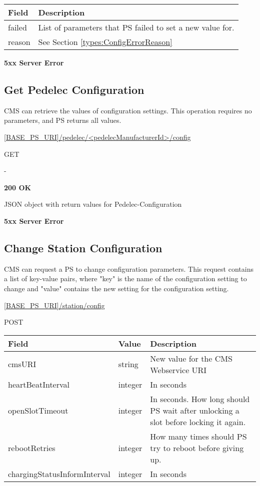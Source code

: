 \begin{tabularx}{\linewidth}{ | l | X | }
  \hline
  \rowcolor{table-head}
  Field & Description \\
  \hline
  failed		& List of parameters that \acs{PS} failed to set a new value for.\\
  reason 	& See Section \ref{types:ConfigErrorReason} \\
  \hline
\end{tabularx}

\textbf{5xx Server Error}

\subsection{Get Pedelec Configuration}

\acs{CMS} can retrieve the values of configuration settings. This operation requires no parameters, and \acs{PS} returns all values.

 \url{[BASE_PS_URI]/pedelec/<pedelecManufacturerId>/config}

 GET

 -

 \textbf{200 OK}

JSON object with return values for Pedelec-Configuration

 \textbf{5xx Server Error}

\subsection{Change Station Configuration}
\label{cms:change-conf}

\acs{CMS} can request a \acs{PS} to change configuration parameters. This request contains a list of key-value pairs, where "key" is the name of the configuration setting to change and "value" contains the new setting for the configuration setting.

 \url{[BASE_PS_URI]/station/config}

 POST

\begin{table}[!h]
\vspace{-7mm}
\begin{tabularx}{\linewidth}{ | l | l | X | }
  \hline
  \rowcolor{table-head}
  Field & Value & Description \\
  \hline
  cmsURI 			& string 		& New value for the \acs{CMS} Webservice URI \\
  heartBeatInterval 			& integer 		& In seconds \\
  openSlotTimeout 			& integer 		& In seconds. How long should \acs{PS} wait after unlocking a slot before locking it again. \\
  rebootRetries 				& integer 		& How many times should \acs{PS} try to reboot before giving up.\\
  chargingStatusInformInterval 	& integer 		& In seconds \\
  \hline
\end{tabularx}
\end{table}

